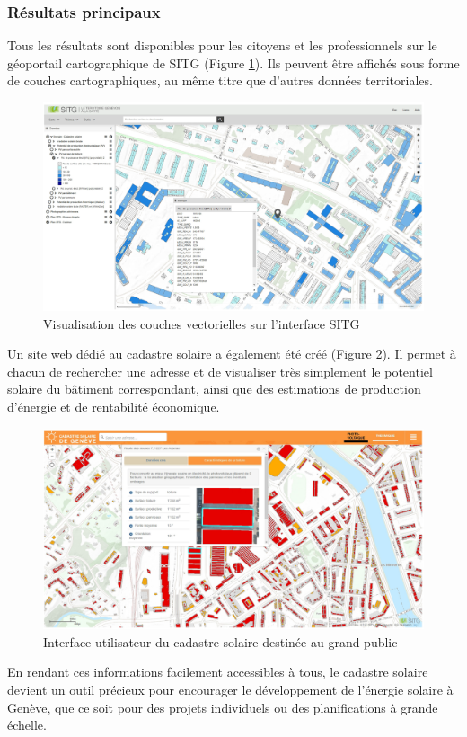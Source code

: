 \subsubsection{Résultats principaux}
\par{Tous les résultats sont disponibles pour les citoyens et les professionnels sur le géoportail cartographique de SITG (Figure \ref{fig:cadastre_solaire_couche_vec_sitg}). Ils peuvent être affichés sous forme de couches cartographiques, au même titre que
d'autres données territoriales.}
\begin{figure}[H]
    \centering
    \includegraphics[width=1\linewidth]{02-main//figures/cadastre_solaire_couche_vec_sitg.png}
    \caption{Visualisation des couches vectorielles sur l'interface SITG \cite{desthieux_solar_2018}}
    \label{fig:cadastre_solaire_couche_vec_sitg}
\end{figure}
\par{Un site web dédié au cadastre solaire a également été créé (Figure \ref{fig:cadastre_solaire_sitg_labs}). Il permet à chacun de rechercher une adresse et de visualiser très simplement le potentiel solaire du bâtiment correspondant, ainsi que des estimations de production d'énergie et de rentabilité économique.}
\begin{figure}[H]
    \centering
    \includegraphics[width=1\linewidth]{02-main//figures/cadastre_solaire_sitg_labs.png}
    \caption{Interface utilisateur du cadastre solaire destinée au grand public \cite{desthieux_solar_2018}}
    \label{fig:cadastre_solaire_sitg_labs}
\end{figure}
\par{En rendant ces informations facilement accessibles à tous, le cadastre solaire devient un outil précieux pour encourager le développement de l'énergie solaire à Genève, que ce soit pour des projets individuels ou des planifications à grande échelle.}


